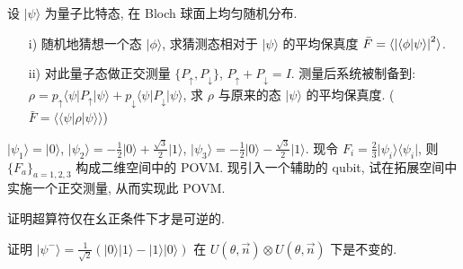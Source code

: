 \documentclass{assignment}
\begin{document}
\begin{probcontinued}{6}
    设 $\lvert\psi\rangle$ 为量子比特态, 在 Bloch 球面上均匀随机分布.
    \begin{itemize}
        \item[i)] 随机地猜想一个态 $\lvert\phi\rangle$, 求猜测态相对于 $\lvert\psi\rangle$ 的平均保真度 $\bar{F}=\langle\left\lvert\langle\phi\vert\psi\rangle\right\rvert^2\rangle$.
        \item[ii)] 对此量子态做正交测量 $\{P_{\uparrow},P_{\downarrow}\}$, $P_{\uparrow}+P_{\downarrow}=I$. 测量后系统被制备到: $\rho=p_{\uparrow}\langle\psi\rvert P_{\uparrow}\lvert\psi\rangle+p_{\downarrow}\langle\psi\rvert P_{\downarrow}\lvert\psi\rangle$, 求 $\rho$ 与原来的态 $\lvert\psi\rangle$ 的平均保真度. ($\bar{F}=\langle\langle\psi\rvert\rho\lvert\psi\rangle\rangle$)
    \end{itemize}
\end{probcontinued}
\begin{sol}
    
\end{sol}

\begin{probcontinued}{7}
    $\lvert\psi_1\rangle=\lvert 0\rangle$, $\lvert\psi_2\rangle=-\frac{1}{2}\lvert 0\rangle+\frac{\sqrt{3}}{2}\lvert 1\rangle$, $\lvert\psi_3\rangle=-\frac{1}{2}\lvert 0\rangle-\frac{\sqrt{3}}{2}\lvert 1\rangle$. 现令 $F_i=\frac{2}{3}\lvert\psi_i\rangle\langle\psi_i\rvert$, 则 $\{F_a\}_{a=1,2,3}$ 构成二维空间中的 POVM. 现引入一个辅助的 qubit, 试在拓展空间中实施一个正交测量, 从而实现此 POVM.
\end{probcontinued}
\begin{sol}
    
\end{sol}

\begin{probcontinued}{8}
    证明超算符仅在幺正条件下才是可逆的.
\end{probcontinued}
\begin{pf}
    
\end{pf}

\begin{probcontinued}{9}
    证明 $\lvert\psi^-\rangle=\frac{1}{\sqrt{2}}(\lvert 0\rangle\lvert 1\rangle-\lvert 1\rangle\lvert 0\rangle)$ 在 $U(\theta,\vec{n})\otimes U(\theta,\vec{n})$ 下是不变的.
\end{probcontinued}
\begin{pf}
    
\end{pf}
\end{document}
